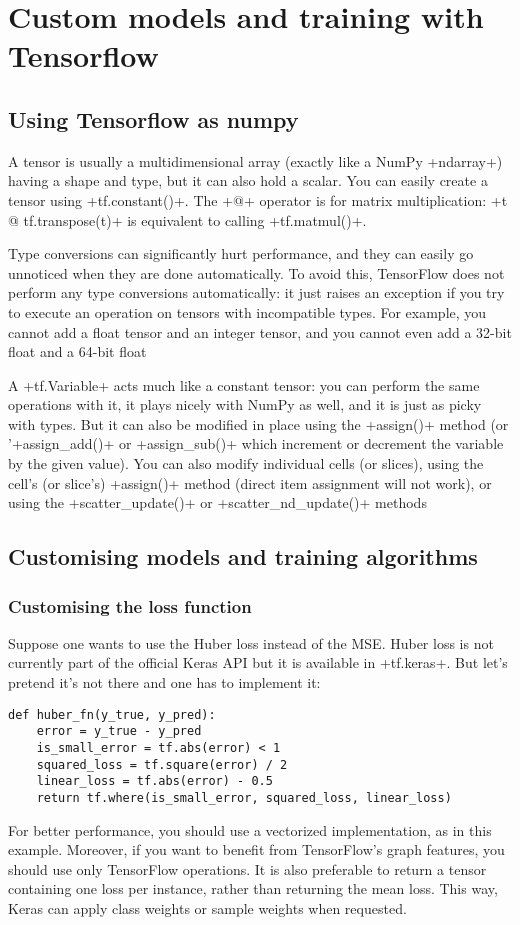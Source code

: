 \section{Custom models and training with Tensorflow}
\subsection{Using Tensorflow as numpy}
A tensor is usually a multidimensional array (exactly like a NumPy \cd+ndarray+) having a shape and type, but it can also hold a scalar. You can easily create a tensor using \cd+tf.constant()+. The \cd+@+ operator is for matrix multiplication: \cd+t @ tf.transpose(t)+ is equivalent to calling \cd+tf.matmul()+.

Type conversions can significantly hurt performance, and they can easily go unnoticed when they are done automatically. To avoid this, TensorFlow does not perform any type conversions automatically: it just raises an exception if you try to execute an operation on tensors with incompatible types. For example, you cannot add a float tensor and an integer tensor, and you cannot even add a 32-bit float and a 64-bit float

A \cd+tf.Variable+ acts much like a constant tensor: you can perform the same operations with it, it plays nicely with NumPy as well, and it is just as picky with types. But it can also be modified in place using the \cd+assign()+ method (or '\cd+assign_add()+ or \cd+assign_sub()+ which increment or decrement the variable by the given value). You can also modify individual cells (or slices), using the cell's (or slice's) \cd+assign()+ method (direct item assignment will not work), or using the \cd+scatter_update()+ or \cd+scatter_nd_update()+ methods

\subsection{Customising  models and training algorithms}
\subsubsection{Customising the loss function}
Suppose one wants to use the Huber loss instead of the MSE. Huber loss is not currently part of the official Keras API but it is available in \cd+tf.keras+. But let's pretend it's not there and one has to implement it:
\begin{lstlisting}
def huber_fn(y_true, y_pred):
	error = y_true - y_pred
	is_small_error = tf.abs(error) < 1
	squared_loss = tf.square(error) / 2
	linear_loss = tf.abs(error) - 0.5
	return tf.where(is_small_error, squared_loss, linear_loss)
\end{lstlisting}
For better performance, you should use a vectorized implementation, as in this example. Moreover, if you want to benefit from TensorFlow's graph features, you should use only TensorFlow operations. 
It is also preferable to return a tensor containing one loss per instance, rather than returning the mean loss. This way, Keras can apply class weights or sample weights when requested.

